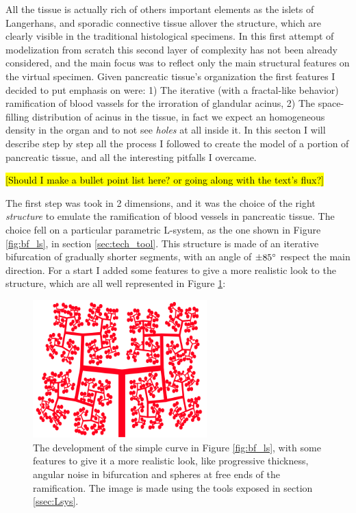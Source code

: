 All the tissue is actually rich of others important elements as the islets of Langerhans, and sporadic connective tissue allover the structure, which are clearly visible in the traditional histological specimens. In this first attempt of modelization from scratch this second layer of complexity has not been already considered, and the main focus was to reflect only the main structural features on the virtual specimen. Given pancreatic tissue's organization the first features I decided to put emphasis on were: 1) The iterative (with a fractal-like behavior) ramification of blood vassels for the irroration of glandular acinus, 2) The space-filling distribution of acinus in the tissue, in fact we expect an homogeneous density in the organ and to not see \textit{holes} at all inside it. In this secton I will describe step by step all the process I followed to create the model of a portion of pancreatic tissue, and all the interesting pitfalls I overcame.

\hl{[Should I make a bullet point list here? or going along with the text's flux?]}

The first step was took in 2 dimensions, and it was the choice of the right \textit{structure} to emulate the ramification of blood vessels in pancreatic tissue. The choice fell on a particular parametric L-system, as the one shown in Figure \ref{fig:bf_ls}, in section \ref{sec:tech_tool}. This structure is made of an iterative bifurcation of gradually shorter segments, with an angle of $\pm 85 \degree$ respect the main direction. For a start I added some features to give a more realistic look to the structure, which are all well represented in Figure \ref{fig:ram_feat}:

\begin{figure}
    \centering
    \includegraphics[width = 0.6\textwidth]{images/ram_feat}
    \caption{The development of the simple curve in Figure \ref{fig:bf_ls}, with some features to give it a more realistic look, like progressive thickness, angular noise in bifurcation and spheres at free ends of the ramification. The image is made using the tools exposed in section \ref{ssec:Lsys}.}
    \label{fig:ram_feat}
\end{figure}


